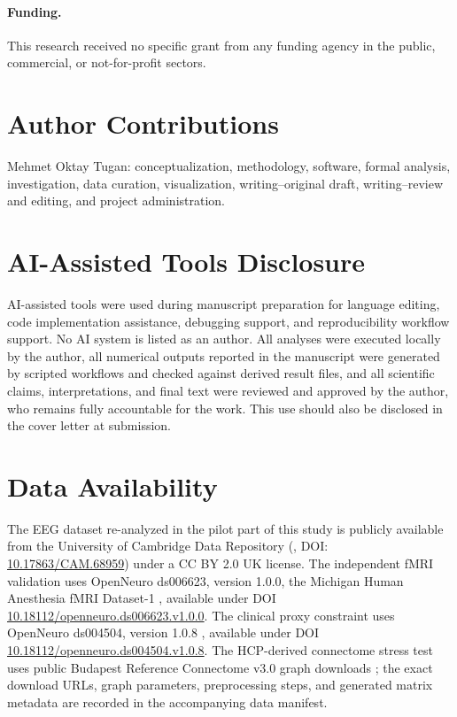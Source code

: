 \documentclass[11pt,a4paper]{article}
\theoremstyle{plain}
\theoremstyle{definition}
\theoremstyle{remark}
\begin{document}
\paragraph{Funding.} This research received no specific grant from any funding agency in the public, commercial, or not-for-profit sectors.

\section*{Author Contributions}

Mehmet Oktay Tugan: conceptualization, methodology, software, formal analysis, investigation, data curation, visualization, writing--original draft, writing--review and editing, and project administration.

\section*{AI-Assisted Tools Disclosure}

AI-assisted tools were used during manuscript preparation for language editing, code implementation assistance, debugging support, and reproducibility workflow support. No AI system is listed as an author. All analyses were executed locally by the author, all numerical outputs reported in the manuscript were generated by scripted workflows and checked against derived result files, and all scientific claims, interpretations, and final text were reviewed and approved by the author, who remains fully accountable for the work. This use should also be disclosed in the cover letter at submission.

\section*{Data Availability}

The EEG dataset re-analyzed in the pilot part of this study is publicly available from the University of Cambridge Data Repository (\citealp{chennu2016}, DOI: \href{https://doi.org/10.17863/CAM.68959}{10.17863/CAM.68959}) under a CC BY 2.0 UK license. The independent fMRI validation uses OpenNeuro ds006623, version 1.0.0, the Michigan Human Anesthesia fMRI Dataset-1 \citep{huang2026,huangopenneuro2025}, available under DOI \href{https://doi.org/10.18112/openneuro.ds006623.v1.0.0}{10.18112/openneuro.ds006623.v1.0.0}. The clinical proxy constraint uses OpenNeuro ds004504, version 1.0.8 \citep{miltiadous2023}, available under DOI \href{https://doi.org/10.18112/openneuro.ds004504.v1.0.8}{10.18112/openneuro.ds004504.v1.0.8}. The HCP-derived connectome stress test uses public Budapest Reference Connectome v3.0 graph downloads \citep{szalkai2015,szalkai2017}; the exact download URLs, graph parameters, preprocessing steps, and generated matrix metadata are recorded in the accompanying data manifest.
\end{document}

